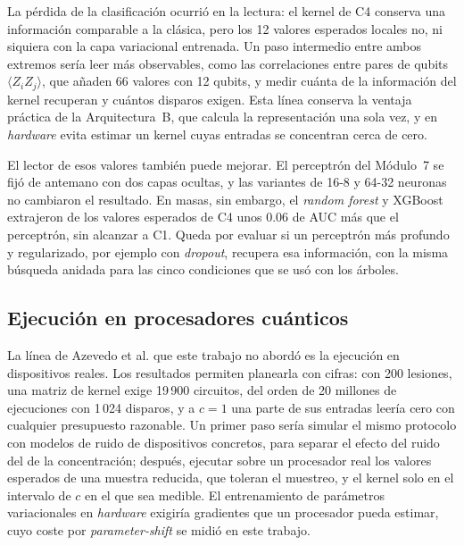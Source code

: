 La pérdida de la clasificación ocurrió en la lectura: el kernel de C4 conserva una información comparable
a la clásica, pero los 12 valores esperados locales no, ni siquiera con la capa variacional entrenada. Un
paso intermedio entre ambos extremos sería leer más observables, como las correlaciones entre pares de
qubits $\langle Z_i Z_j\rangle$, que añaden 66 valores con 12 qubits, y medir cuánta de la información del
kernel recuperan y cuántos disparos exigen. Esta línea conserva la ventaja práctica de la Arquitectura~B,
que calcula la representación una sola vez, y en \textit{hardware} evita estimar un kernel cuyas entradas
se concentran cerca de cero.

El lector de esos valores también puede mejorar. El perceptrón del Módulo~7 se fijó de antemano con dos
capas ocultas, y las variantes de 16-8 y 64-32 neuronas no cambiaron el resultado. En masas, sin embargo,
el \textit{random forest} y XGBoost extrajeron de los valores esperados de C4 unos 0.06 de AUC más que el
perceptrón, sin alcanzar a C1. Queda por evaluar si un perceptrón más profundo y regularizado, por ejemplo
con \textit{dropout}, recupera esa información, con la misma búsqueda anidada para las cinco condiciones
que se usó con los árboles.

\subsection{Ejecución en procesadores cuánticos}
\label{sec:futuro_hardware}

La línea de Azevedo et al. \cite{Azevedo2022QuantumTransfer} que este trabajo no abordó es la ejecución
en dispositivos reales. Los resultados permiten planearla con cifras: con 200 lesiones, una matriz de
kernel exige 19\,900 circuitos, del orden de 20 millones de ejecuciones con 1\,024 disparos, y a $c = 1$
una parte de sus entradas leería cero con cualquier presupuesto razonable. Un primer paso sería simular
el mismo protocolo con modelos de ruido de dispositivos concretos, para separar el efecto del ruido del de
la concentración; después, ejecutar sobre un procesador real los valores esperados de una muestra
reducida, que toleran el muestreo, y el kernel solo en el intervalo de $c$ en el que sea medible. El
entrenamiento de parámetros variacionales en \textit{hardware} exigiría gradientes que un procesador
pueda estimar, cuyo coste por \textit{parameter-shift} se midió en este trabajo.

